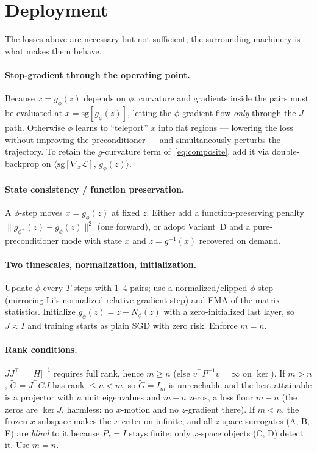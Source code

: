 \documentclass[11pt]{article}
\theoremstyle{plain}
\theoremstyle{definition}
\theoremstyle{remark}
\newcommand{\Loss}{\mathcal{L}}
\newcommand{\sg}{\mathrm{sg}}
\newcommand{\norm}[1]{\lVert #1 \rVert}
\begin{document}
\section{Deployment}
\label{sec:deploy}

The losses above are necessary but not sufficient; the surrounding machinery is what makes
them behave.

\paragraph{Stop-gradient through the operating point.}
Because $x=g_\phi(z)$ depends on $\phi$, curvature and gradients inside the pairs must be
evaluated at $\bar x=\sg[g_\phi(z)]$, letting the $\phi$-gradient flow \emph{only} through
the $J$-path. Otherwise $\phi$ learns to ``teleport'' $x$ into flat regions --- lowering the
loss without improving the preconditioner --- and simultaneously perturbs the trajectory. To
retain the $g$-curvature term of~\eqref{eq:composite}, add it via double-backprop on
$\big\langle\sg[\nabla_x\Loss],\,g_\phi(z)\big\rangle$.

\paragraph{State consistency / function preservation.}
A $\phi$-step moves $x=g_\phi(z)$ at fixed $z$. Either add a function-preserving penalty
$\norm{g_{\phi^+}(z)-g_\phi(z)}^2$ (one forward), or adopt Variant~D and a pure-preconditioner
mode with state $x$ and $z=g^{-1}(x)$ recovered on demand.

\paragraph{Two timescales, normalization, initialization.}
Update $\phi$ every $T$ steps with $1$--$4$ pairs; use a normalized/clipped $\phi$-step
(mirroring Li's normalized relative-gradient step) and EMA of the matrix statistics.
Initialize $g_\phi(z)=z+N_\phi(z)$ with a zero-initialized last layer, so $J\approx I$ and
training starts as plain SGD with zero risk. Enforce $m=n$.

\paragraph{Rank conditions.}
\label{sub:rank}
$JJ^{\!\top}=|H|^{-1}$ requires full rank, hence $m\ge n$ (else $v^{\!\top}P^{-1}v=\infty$ on
$\ker$). If $m>n$, $\tilde G=J^{\!\top}GJ$ has rank $\le n<m$, so $\tilde G=I_m$ is unreachable
and the best attainable is a projector with $n$ unit eigenvalues and $m-n$ zeros, a loss
floor $m-n$ (the zeros are $\ker J$, harmless: no $x$-motion and no $z$-gradient there). If
$m<n$, the frozen $x$-subspace makes the $x$-criterion infinite, and all $z$-space surrogates
(A, B, E) are \emph{blind} to it because $P_z=I$ stays finite; only $x$-space objects (C, D)
detect it. Use $m=n$.
\end{document}
